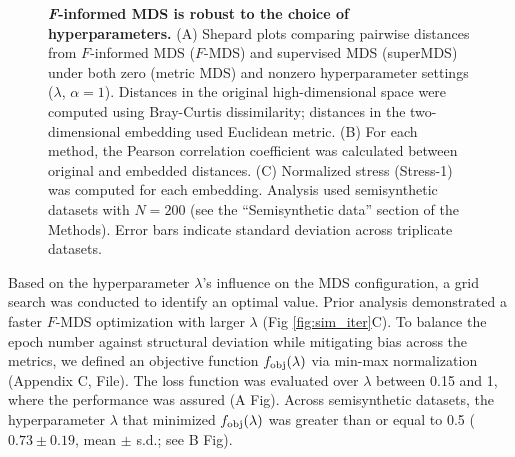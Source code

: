 \documentclass[10pt,letterpaper]{article}
\newcommand{\1}{{\rm 1}\kern-0.24em{\rm I}}
\begin{document}
\begin{figure}[h!]
    \centering
    \caption{\textbf{\textit{F}-informed MDS is robust to the choice of hyperparameters.} (A) Shepard plots comparing pairwise distances from $F$-informed MDS ($F$-MDS) and supervised MDS (superMDS) under both zero (metric MDS) and nonzero hyperparameter settings ($\lambda$, $\alpha=1$). Distances in the original high-dimensional space were computed using Bray-Curtis dissimilarity; distances in the two-dimensional embedding used Euclidean metric. (B) For each method, the Pearson correlation coefficient was calculated between original and embedded distances. (C) Normalized stress (Stress-1) was computed for each embedding. Analysis used semisynthetic datasets with $N=200$ (see the ``Semisynthetic data'' section of the Methods). Error bars indicate standard deviation across triplicate datasets.}
    \label{fig:mds_eval_sim}
\end{figure}


Based on the hyperparameter $\lambda$'s influence on the MDS configuration, a grid search was conducted to identify an optimal value. Prior analysis demonstrated a faster $F$-MDS optimization with larger $\lambda$ (Fig \ref{fig:sim_iter}C). To balance the epoch number against structural deviation while mitigating bias across the metrics, we defined an objective function $f_{\rm obj}(\lambda)$ via min-max normalization (Appendix C,  File). The loss function was evaluated over $\lambda$ between 0.15 and 1, where the performance was assured (A Fig). Across semisynthetic datasets, the hyperparameter $\lambda$ that minimized $f_{\rm obj}(\lambda)$ was greater than or equal to 0.5 ($0.73\pm0.19$, mean $\pm$ s.d.; see B Fig).

 
\end{document}

